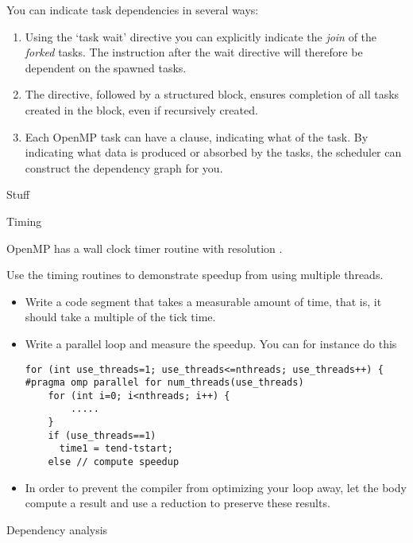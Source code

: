 You can indicate task dependencies in several ways:
\begin{enumerate}
\item Using the `task wait' directive you can explicitly indicate
  the \emph{join} of the
  \emph{forked} tasks. The instruction after the wait directive
  will therefore be dependent on the spawned tasks.
\item The  directive, followed
  by a structured block, ensures completion of all tasks
  created in the block, even if recursively created.
\item Each OpenMP task can have a 
  clause, indicating what  of the task.
  By indicating what data is produced or absorbed by the tasks,
  the scheduler can construct the dependency graph for you.
\end{enumerate}

 {Stuff}

 {Timing}

OpenMP has a wall clock timer routine 
with resolution .

\begin{exercise}
  Use the timing routines to demonstrate speedup from using
  multiple threads.
  \begin{itemize}
  \item Write a code segment that takes a measurable amount of time, that is,
    it should take a multiple of the tick time.
  \item Write a parallel loop and measure the speedup. You can for instance do this
\begin{verbatim}
for (int use_threads=1; use_threads<=nthreads; use_threads++) {
#pragma omp parallel for num_threads(use_threads)
    for (int i=0; i<nthreads; i++) {
        .....
    }
    if (use_threads==1)
      time1 = tend-tstart;
    else // compute speedup
\end{verbatim}
\item In order to prevent the compiler from optimizing your loop away, let
  the body compute a result and use a reduction to preserve these results.
  \end{itemize}
\end{exercise}

 {Dependency analysis}

